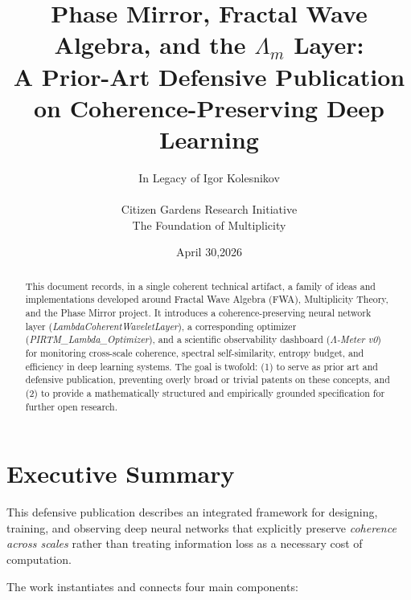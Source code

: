 \documentclass[11pt]{article}
\title{%
Phase Mirror, Fractal Wave Algebra, and the \texorpdfstring{$\Lambda_m$}{} Layer:\\[3pt]
A Prior-Art Defensive Publication on Coherence-Preserving Deep Learning
}
\author{In Legacy of Igor Kolesnikov \\ \\ Citizen Gardens Research Initiative \\ The Foundation of Multiplicity}
\date{April 30,2026}
\begin{document}
\maketitle

\begin{abstract}
This document records, in a single coherent technical artifact, a family of ideas and implementations developed around Fractal Wave Algebra (FWA), Multiplicity Theory, and the Phase Mirror project. It introduces a coherence-preserving neural network layer (\emph{LambdaCoherentWaveletLayer}), a corresponding optimizer (\emph{PIRTM\_Lambda\_Optimizer}), and a scientific observability dashboard (\emph{$\Lambda$-Meter v0}) for monitoring cross-scale coherence, spectral self-similarity, entropy budget, and efficiency in deep learning systems. The goal is twofold: (1) to serve as prior art and defensive publication, preventing overly broad or trivial patents on these concepts, and (2) to provide a mathematically structured and empirically grounded specification for further open research.
\end{abstract}

\tableofcontents
\newpage
\section{Executive Summary}

This defensive publication describes an integrated framework for designing, training, and observing deep neural networks that explicitly preserve \emph{coherence across scales} rather than treating information loss as a necessary cost of computation.

The work instantiates and connects four main components:
\end{document}
